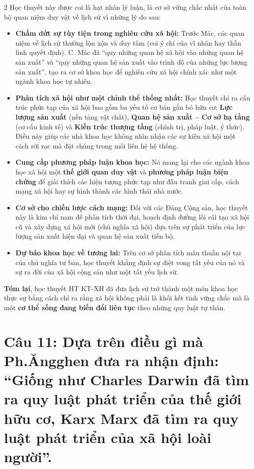 \documentclass[9pt,a4paper]{extarticle}
\begin{document}
\begin{multicols*}{2}
Học thuyết này được coi là hạt nhân lý luận, là cơ sở vững chắc nhất của toàn bộ quan niệm duy vật về lịch sử vì những lý do sau:

\begin{itemize}
\item \textbf{Chấm dứt sự tùy tiện trong nghiên cứu xã hội:} Trước Mác, các quan niệm về lịch sử thường lộn xộn và duy tâm (coi ý chí của vĩ nhân hay thần linh quyết định). C. Mác đã ``quy những quan hệ xã hội vào những quan hệ sản xuất'' và ``quy những quan hệ sản xuất vào trình độ của những lực lượng sản xuất'', tạo ra cơ sở khoa học để nghiên cứu xã hội chính xác như một ngành khoa học tự nhiên.
\item \textbf{Phân tích xã hội như một chỉnh thể thống nhất:} Học thuyết chỉ ra cấu trúc phức tạp của xã hội bao gồm ba yếu tố cơ bản gắn bó hữu cơ: \textbf{Lực lượng sản xuất} (nền tảng vật chất), \textbf{Quan hệ sản xuất -- Cơ sở hạ tầng} (cơ cấu kinh tế) và \textbf{Kiến trúc thượng tầng} (chính trị, pháp luật, ý thức). Điều này giúp các nhà khoa học không nhìn nhận các sự kiện xã hội một cách rời rạc mà đặt chúng trong mối liên hệ hệ thống.
\item \textbf{Cung cấp phương pháp luận khoa học:} Nó mang lại cho các ngành khoa học xã hội một \textbf{thế giới quan duy vật} và \textbf{phương pháp luận biện chứng} để giải thích các hiện tượng phức tạp như đấu tranh giai cấp, cách mạng xã hội hay sự hình thành các hình thái nhà nước.
\item \textbf{Cơ sở cho chiến lược cách mạng:} Đối với các Đảng Cộng sản, học thuyết này là kim chỉ nam để phân tích thời đại, hoạch định đường lối cải tạo xã hội cũ và xây dựng xã hội mới (chủ nghĩa xã hội) dựa trên sự phát triển của lực lượng sản xuất hiện đại và quan hệ sản xuất tiến bộ.
\item \textbf{Dự báo khoa học về tương lai:} Trên cơ sở phân tích mâu thuẫn nội tại của chủ nghĩa tư bản, học thuyết khẳng định sự diệt vong tất yếu của nó và sự ra đời của xã hội cộng sản như một tất yếu lịch sử.
\end{itemize}

\textbf{Tóm lại}, học thuyết HT KT-XH đã đưa lịch sử trở thành một môn khoa học thực sự bằng cách chỉ ra rằng xã hội không phải là khối kết tinh vững chắc mà là một \textbf{cơ thể sống đang biến đổi liên tục} theo những quy luật tự thân.

\section*{Câu 11: Dựa trên điều gì mà Ph.Ăngghen đưa ra nhận định: ``Giống như Charles Darwin đã tìm ra quy luật phát triển của thế giới hữu cơ, Karx Marx đã tìm ra quy luật phát triển của xã hội loài người''.}


\end{multicols*}
\end{document}
